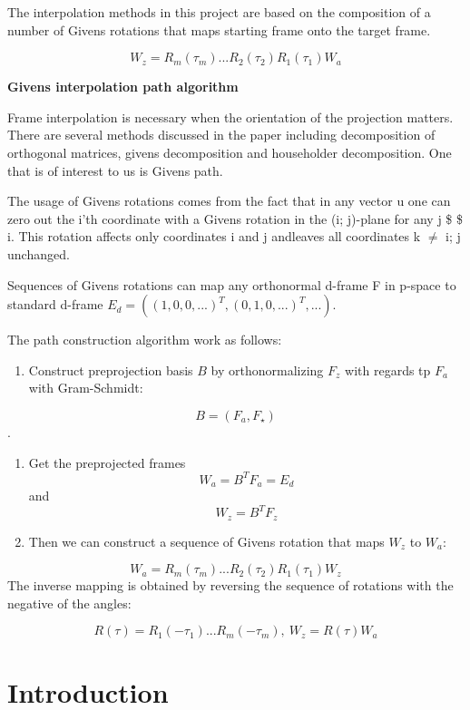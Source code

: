 The interpolation methods in this project are based on the composition of a number of Givens rotations that maps starting frame onto the target frame.

\[ W_z = R_m(\tau_m) ... R_2(\tau_2)R_1(\tau_1)W_a\]

\textbf{Givens interpolation path algorithm}

Frame interpolation is necessary when the orientation of the projection matters. There are several methods discussed in the paper including decomposition of orthogonal matrices, givens decomposition and householder decomposition. One that is of interest to us is Givens path.

The usage of Givens rotations comes from the fact that in any vector u one can zero out the i'th coordinate with a Givens rotation in the (i; j)-plane for any j \$ \neq \$ i. This rotation affects only coordinates i and j andleaves all coordinates k \(\neq\) i; j unchanged.

Sequences of Givens rotations can map any orthonormal d-frame F in p-space to standard d-frame \(E_d=((1, 0, 0, ...)^T, (0, 1, 0, ...)^T, ...)\).

The path construction algorithm work as follows:

\begin{enumerate}
\def\labelenumi{\arabic{enumi}.}
\tightlist
\item
  Construct preprojection basis \(B\) by orthonormalizing \(F_z\) with regards tp \(F_a\) with Gram-Schmidt:
\end{enumerate}

\[B = (F_a, F_{\star})\].

\begin{enumerate}
\def\labelenumi{\arabic{enumi}.}
\setcounter{enumi}{1}
\tightlist
\item
  Get the preprojected frames
  \[W_a = B^TF_a = E_d\] and \[W_z = B^TF_z\]
\item
  Then we can construct a sequence of Givens rotation that maps \(W_z\) to \(W_a\):
\end{enumerate}

\[ W_a = R_m(\tau_m) ... R_2(\tau_2)R_1(\tau_1)W_z\] The inverse mapping is obtained by reversing the sequence of rotations with the negative of the angles:

\[R(\tau) = R_1(-\tau_1) ... R_m(-\tau_m), \    W_z = R(\tau)W_a\]

\hypertarget{introduction-1}{%
\section{Introduction}\label{introduction-1}}

